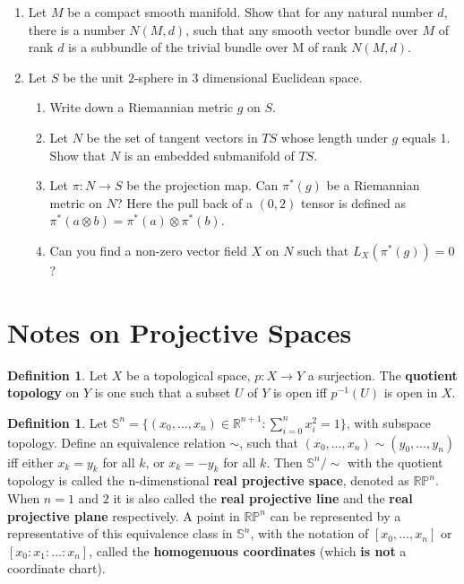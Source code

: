 \documentclass{article}
\theoremstyle{definition}
\newtheorem{dfn}[thm]{Definition}
\begin{document}
\begin{enumerate}
    \item Let $M$ be a compact smooth manifold. Show that for any natural number $d$, there is a number $N(M, d)$, such that any smooth vector bundle over $M$ of rank $d$ is a subbundle of the trivial bundle over M of rank $N(M, d)$.
    \item Let $S$ be the unit $2$-sphere in 3 dimensional Euclidean space.
    \begin{enumerate}[(1)]
        \item Write down a Riemannian metric $g$ on $S$.
        \item Let $N$ be the set of tangent vectors in $TS$ whose length under $g$ equals 1. Show that $N$ is an embedded submanifold of $TS$.
        \item Let $\pi: N\rightarrow S$ be the projection map. Can $\pi^*(g)$ be a Riemannian metric on $N$? Here the pull back of a $(0, 2)$ tensor is defined as $\pi^*(a\otimes b)=\pi^*(a)\otimes \pi^*(b)$.
        \item Can you find a non-zero vector field $X$ on $N$ such that $L_X(\pi^*(g))=0$?
    \end{enumerate}
\end{enumerate}

\newpage

\section{Notes on Projective Spaces}

\begin{dfn}
    Let $X$ be a topological space, $p: X\rightarrow Y$ a surjection. The {\bf quotient topology} on $Y$ is one such that a subset $U$ of $Y$ is open iff $p^{-1}(U)$ is open in $X$.
\end{dfn}

\begin{dfn}
    Let $\mathbb{S}^n=\{(x_0, \dots, x_n)\in\mathbb{R}^{n+1}: \sum_{i=0}^n x_i^2=1\}$, with subspace topology. Define an equivalence relation $\sim$, such that $(x_0, \dots, x_n)\sim (y_0, \dots, y_n)$ iff either $x_k=y_k$ for all $k$, or $x_k=-y_k$ for all $k$. Then $\mathbb{S}^n/\sim$ with the quotient topology is called the n-dimenstional {\bf real projective space}, denoted as $\mathbb{RP}^n$. When $n=1$ and $2$ it is also called the {\bf real projective line} and the {\bf real projective plane} respectively. A point in $\mathbb{RP}^n$ can be represented by a representative of this equivalence class in $\mathbb{S}^n$, with the notation of $[x_0, \dots, x_n]$ or $[x_0:x_1:\dots:x_n]$, called the {\bf homogenuous coordinates} (which {\bf is not} a coordinate chart). 
\end{dfn}
\end{document}
